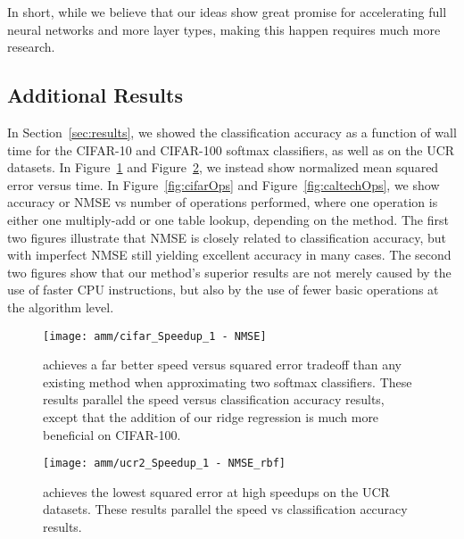 In short, while we believe that our ideas show great promise for accelerating full neural networks and more layer types, making this happen requires much more research.%

\subsection{Additional Results}

In Section~\ref{sec:results}, we showed the classification accuracy as a function of wall time for the CIFAR-10 and CIFAR-100 softmax classifiers, as well as on the UCR datasets. In Figure~\ref{fig:cifarNMSE} and Figure~\ref{fig:ucrNMSE}, we instead show normalized mean squared error versus time. In Figure~\ref{fig:cifarOps} and Figure~\ref{fig:caltechOps}, we show accuracy or NMSE vs number of operations performed, where one operation is either one multiply-add or one table lookup, depending on the method. The first two figures illustrate that NMSE is closely related to classification accuracy, but with imperfect NMSE still yielding excellent accuracy in many cases. The second two figures show that our method's superior results are not merely caused by the use of faster CPU instructions, but also by the use of fewer basic operations at the algorithm level.

\begin{figure}[h]
\begin{center}
\texttt{[image: amm/cifar\_Speedup\_1 - NMSE]}
\caption{\oursp achieves a far better speed versus squared error tradeoff than any existing method when approximating two softmax classifiers. These results parallel the speed versus classification accuracy results, except that the addition of our ridge regression is much more beneficial on CIFAR-100.}
\label{fig:cifarNMSE}
\end{center}
\end{figure}

\begin{figure}[h]
\begin{center}
\texttt{[image: amm/ucr2\_Speedup\_1 - NMSE\_rbf]}
\caption{\oursp achieves the lowest squared error at high speedups on the UCR datasets. These results parallel the speed vs classification accuracy results.}
\label{fig:ucrNMSE}
\end{center}
\end{figure}

